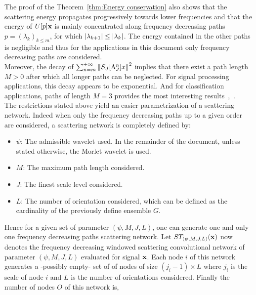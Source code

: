 \documentclass[a4paper,11pt]{report}
\begin{document}
			The proof of the Theorem~\ref{thm:Energy conservation} also shows that the scattering energy propagates progressively towards lower frequencies and that the energy of $U[p]{\bf x}$ is mainly concentrated along frequency decreasing paths $p=(\lambda_{k})_{k\leq m}$, \ie for which $\left| \lambda_{k+1} \right| \leq \left| \lambda_{k} \right|$. The energy contained in the other paths is negligible and thus for the applications in this document only frequency decreasing paths are considered.\\
			
			Moreover, the decay of $\sum_{n=m}^{+\infty} \left\lVert S_{J}[\Lambda_{J}^{n}]x \right\rVert^{2}$ implies that there exist a path length $M > 0$ after which all longer paths can be neglected. For signal processing applications, this decay appears to be exponential. And for classification applications, paths of length $M = 3$ provides the most interesting results~\citep{anden2011multiscale},~\citep{bruna2010classification}.\\
			
			The restrictions stated above yield an easier parametrization of a scattering network. Indeed when only the frequency decreasing paths up to a given order are considered, a scattering network is completely defined by:\\
			\begin{itemize}
				\item $\psi$: The admissible wavelet used. In the remainder of the document, unless stated otherwise, the Morlet wavelet is used.
			  \item $M$: The maximum path length considered.
			  \item $J$: The finest scale level considered.
			  \item $L$: The number of orientation considered, which can be defined as the cardinality of the previously define ensemble $G$.\\
			\end{itemize}
			
			Hence for a given set of parameter $(\psi, M,J,L)$, one can generate one and only one frequency decreasing paths scattering network. Let $ST_{(\psi, M,J,L)}({\bf x})$ now denotes the frequency decreasing windowed scattering convolutional network of parameter $(\psi, M,J,L)$ evaluated for signal ${\bf x}$. Each node $i$ of this network generates a -possibly empty- set of of nodes of size $(j_{i}-1) \times L$ where $j_{i}$ is the scale of node $i$ and $L$ is the number of orientations considered. Finally the number of nodes $O$ of this network is,
			
\end{document}
